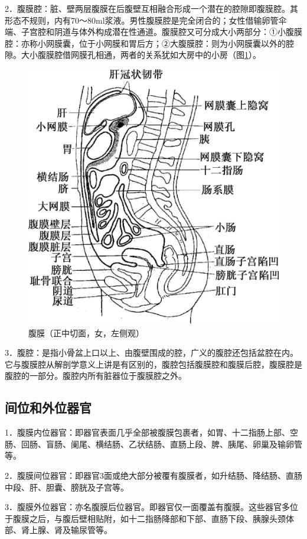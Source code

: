 2．腹膜腔：脏、壁两层腹膜在后腹壁互相融合形成一个潜在的腔隙即腹膜腔。其形态不规则，内有70～80ml浆液。男性腹膜腔是完全闭合的；女性借输卵管伞端、子宫腔和阴道与体外构成潜在性通道。腹膜腔又可分成大小两部分：①小腹膜腔：亦称小网膜囊，位于小网膜和胃后方；②大腹膜腔：则为小网膜囊以外的腔隙。大小腹膜腔借网膜孔相通，两者的关系犹如大房中的小房（图\ref{fig18-1}）。

\begin{figure}[!htbp]
 \centering
 \includegraphics[width=.7\textwidth,height=\textheight,keepaspectratio]{./images/Image00370.jpg}
 \captionsetup{justification=centering}
 \caption{腹膜（正中切面，女，左侧观）}
 \label{fig18-1}
  \end{figure} 

3．腹腔：是指小骨盆上口以上、由腹壁围成的腔，广义的腹腔还包括盆腔在内。它与腹膜腔从解剖学意义上讲是有区别的，腹腔包括腹膜腔和腹膜后腔，腹膜腔是腹腔的一部分。腹腔内所有脏器位于腹膜腔之外。

\subsection{间位和外位器官}

1．腹膜内位器官：即器官表面几乎全部被腹膜包裹者，如胃、十二指肠上部、空肠、回肠、盲肠、阑尾、横结肠、乙状结肠、直肠上段、脾、胰尾、卵巢及输卵管等。

2．腹膜间位器官：即器官3面或绝大部分被覆有腹膜者，如升结肠、降结肠、直肠中段、肝、胆囊、膀胱及子宫等。

3．腹膜外位器官：亦名腹膜后位器官。即器官仅一面覆盖有腹膜。这些器官多位于腹膜之后，与腹后壁相贴附，如十二指肠降部和下部、直肠下段、胰腺头颈体部、肾上腺、肾及输尿管等。

